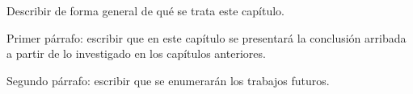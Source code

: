 Describir de forma general de qué se trata este capítulo.

Primer párrafo: escribir que en este capítulo se presentará la conclusión arribada a partir de lo investigado en los capítulos anteriores.

Segundo párrafo: escribir que se enumerarán los trabajos futuros.